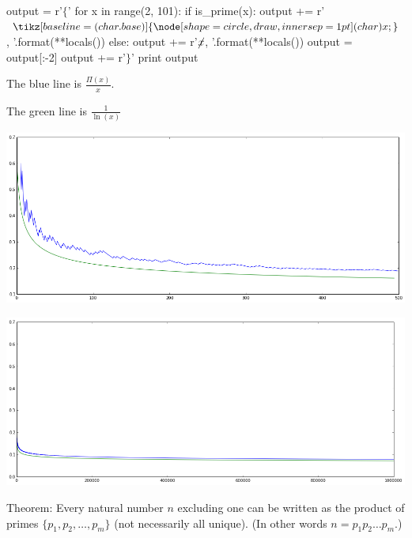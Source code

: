 \item 
\newcommand*\circled[1]{
\tikz[baseline=(char.base)]{
\node[shape=circle,draw,inner sep=1pt] (char) {#1};
}
}

\begin{python}[tools.py]
output = r'$\{$'
for x in range(2, 101):
    if is_prime(x):
        output += r'$\circled{{{x}}}$, '.format(**locals())
    else:
        output += r'$\cancel{{{x}}}$, '.format(**locals())
output = output[:-2]
output += r'$\}$'
print output
\end{python}

\item 
The blue line is $\frac{\Pi(x)}{x}$.

The green line is $\frac{1}{\ln(x)}$

\includegraphics[width=6in]{resources/primes_small.png}

\includegraphics[width=6in]{resources/primes_large.png}

\item Theorem: Every natural number \(n\) excluding one can be written as the product of primes \(\{p_1, p_2, \dots, p_m\}\) (not necessarily all unique). (In other words \(n = p_1 p_2 \dots p_m\).)


